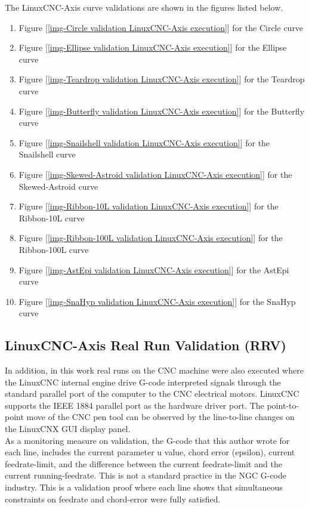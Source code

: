 \noindent
The LinuxCNC-Axis curve validations are shown in the figures listed below.
\begin{enumerate}
	\item Figure [\ref{img-Circle validation LinuxCNC-Axis execution}] for the Circle curve
	\item Figure [\ref{img-Ellipse validation LinuxCNC-Axis execution}] for the Ellipse curve
	\item Figure [\ref{img-Teardrop validation LinuxCNC-Axis execution}] for the Teardrop curve
	\item Figure [\ref{img-Butterfly validation LinuxCNC-Axis execution}] for the Butterfly curve
	\item Figure [\ref{img-Snailshell validation LinuxCNC-Axis execution}] for the Snailshell curve
	\item Figure [\ref{img-Skewed-Astroid validation LinuxCNC-Axis execution}] for the Skewed-Astroid curve
	\item Figure [\ref{img-Ribbon-10L validation LinuxCNC-Axis execution}] for the Ribbon-10L curve
	\item Figure [\ref{img-Ribbon-100L validation LinuxCNC-Axis execution}] for the Ribbon-100L curve
	\item Figure [\ref{img-AstEpi validation LinuxCNC-Axis execution}] for the AstEpi curve
	\item Figure [\ref{img-SnaHyp validation LinuxCNC-Axis execution}] for the SnaHyp curve	
\end{enumerate}

\subsection{LinuxCNC-Axis Real Run Validation (RRV)}

In addition, in this work real runs on the CNC machine were also executed where the LinuxCNC internal engine drive G-code interpreted signals through the standard parallel port of the computer to the CNC electrical motors. LinuxCNC supports the IEEE 1884 parallel port as the hardware driver port. The point-to-point move of the CNC pen tool can be observed by the line-to-line changes on the LinuxCNX GUI display panel.\\ 
	
As a monitoring measure on validation, the G-code that this author wrote for each line, includes the current parameter u value, chord error (epsilon), current feedrate-limit, and the difference between the current feedrate-limit and the current running-feedrate. This is not a standard practice in the NGC G-code industry. This is a validation proof where each line shows that simultaneous constraints on feedrate and chord-error were fully satisfied. \\ 
	
